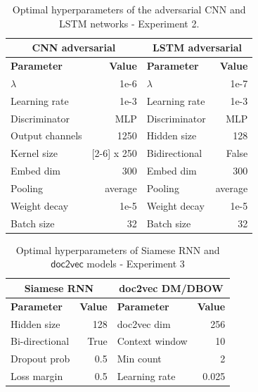 \documentclass{sigkddExp}
\begin{document}
\begin{table}[h]
    \begin{tabular}{l|r|l|r}
          \multicolumn{2}{c|}{\textbf{CNN adversarial}}
         & \multicolumn{2}{c}{\textbf{LSTM adversarial}}
         \\
         \toprule
         \textbf{Parameter}
         & \textbf{Value}
         & \textbf{Parameter}
         & \textbf{Value}
         \\
         \midrule
         $\lambda$
         & 1e-6
         & $\lambda$
         & 1e-7
         \\
         Learning rate
         & 1e-3
         & Learning rate
         & 1e-3
         \\
         Discriminator
         &  MLP
         & Discriminator
         &  MLP
         \\
         Output channels
         & 1250
         & Hidden size
         & 128
         \\
         Kernel size
         & [2-6] x 250
         & Bidirectional
         & False
         \\
         Embed dim
         & 300
         & Embed dim
         & 300
         \\
         Pooling
         & average
         & Pooling
         & average
         \\
         Weight decay
         & 1e-5 
         & Weight decay
         & 1e-5 
         \\         
         Batch size
         & 32
         & Batch size
         & 32
    \end{tabular}
    \caption{Optimal hyperparameters of the adversarial CNN and LSTM networks - Experiment 2.}
    \label{tab:param_adversarial}
\end{table}
\begin{table}[h]
 \begin{tabular}{l|r|l|r}
          \multicolumn{2}{c|}{\textbf{Siamese RNN}}
         & \multicolumn{2}{c}{\textbf{\textsf{doc2vec DM/DBOW}}}
         \\
         \toprule
         \textbf{Parameter}
         & \textbf{Value}
         & \textbf{Parameter}
         & \textbf{Value}
         \\
         \midrule
         Hidden size
         & 128
         & \textsf{doc2vec} dim
         & 256
         \\
         Bi-directional
         & True
         & Context window
         & 10
         \\
         Dropout prob
         & 0.5
         & Min count
         & 2
         \\
         Loss margin
         & 0.5
         & Learning rate
         & 0.025
    \end{tabular}
    \caption{Optimal hyperparameters of Siamese RNN and $\mathsf{doc2vec}$ models - Experiment 3}
    \label{tab:part3_params}
\end{table}
\end{document}
